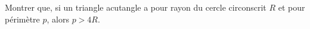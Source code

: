Montrer que, si un triangle acutangle a pour rayon du cercle circonscrit $R$ et pour périmètre $p$, alors $p > 4R$.
